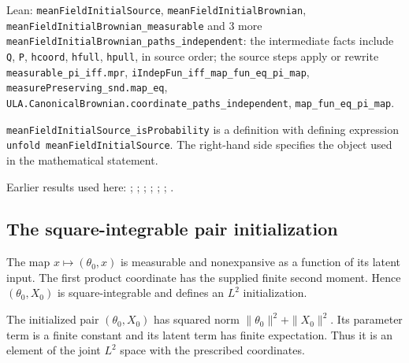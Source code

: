 \documentclass[11pt,a4paper]{report}
\begin{document}
\begin{leanbox}{Lean: \texttt{meanFieldInitialSource}, \texttt{meanFieldInitialBrownian}, \texttt{meanFieldInitialBrownian\_\allowbreak{}measurable} and 3 more}
\texttt{mean\allowbreak{}Field\allowbreak{}Initial\allowbreak{}Brownian\_\allowbreak{}paths\_\allowbreak{}independent}: the intermediate facts include \texttt{Q}, \texttt{P}, \texttt{hcoord}, \texttt{hfull}, \texttt{hpull}, in source order; the source steps apply or rewrite \texttt{measurable\_\allowbreak{}pi\_\allowbreak{}iff.\allowbreak{}mpr}, \texttt{i\allowbreak{}Indep\allowbreak{}Fun\_\allowbreak{}iff\_\allowbreak{}map\_\allowbreak{}fun\_\allowbreak{}eq\_\allowbreak{}pi\_\allowbreak{}map}, \texttt{measure\allowbreak{}Preserving\_\allowbreak{}snd.\allowbreak{}map\_\allowbreak{}eq}, \texttt{ULA.\allowbreak{}Canonical\allowbreak{}Brownian.\allowbreak{}coordinate\_\allowbreak{}paths\_\allowbreak{}independent}, \texttt{map\_\allowbreak{}fun\_\allowbreak{}eq\_\allowbreak{}pi\_\allowbreak{}map}.



\texttt{mean\allowbreak{}Field\allowbreak{}Initial\allowbreak{}Source\_\allowbreak{}is\allowbreak{}Probability} is a definition with defining expression \texttt{unfold mean\allowbreak{}Field\allowbreak{}Initial\allowbreak{}Source}. The right-hand side specifies the object used in the mathematical statement.
\end{leanbox}


Earlier results used here: \cite[Section~3.32.1]{LangevinLean2026ULASC}; \cite[Section~3.8.11]{LangevinLean2026ULASC}; \cite[Section~3.8.16]{LangevinLean2026ULASC}; \cite[Section~3.8.17]{LangevinLean2026ULASC}; \cite[Section~3.8.19]{LangevinLean2026ULASC}; \cite[Section~3.8.20]{LangevinLean2026ULASC}; \cite[Section~3.8.21]{LangevinLean2026ULASC}.
\subsection{\texorpdfstring{The square-integrable pair initialization}{The square-integrable pair initialization}}
\label{report-step-ProximalLangevin-MeanFieldInitialSource-lean-2}


The map \(x\mapsto(\theta_0,x)\) is measurable and nonexpansive as a function of its latent input. The first product coordinate has the supplied finite second moment. Hence \((\theta_0,X_0)\) is square-integrable and defines an \(L^2\) initialization.



The initialized pair \((\theta_0,X_0)\) has squared norm \(\|\theta_0\|^2+\|X_0\|^2\). Its parameter term is a finite constant and its latent term has finite expectation. Thus it is an element of the joint \(L^2\) space with the prescribed coordinates.
\end{document}

